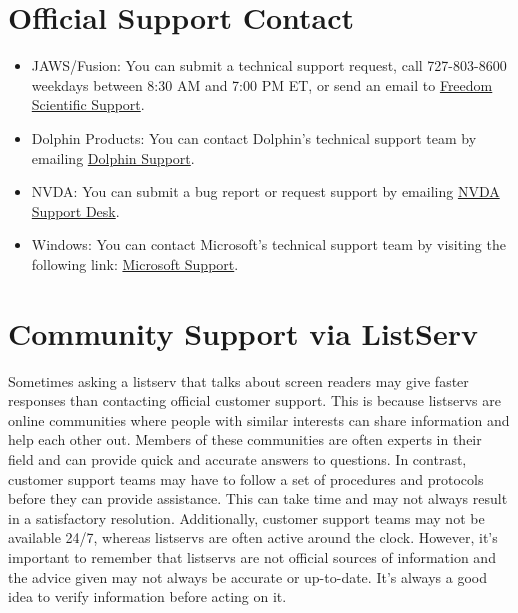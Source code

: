 \documentclass[12pt,letterpaper,twoside]{extreport}
\begin{document}
\begin{appendices}
\hypertarget{report}{}\section{Official Support Contact}\label{report}
\begin{itemize}[leftmargin=*]
\item JAWS/Fusion: You can submit a technical support request, call 727-803-8600 weekdays between 8:30 AM and 7:00 PM ET, or send an email to \href{http://support@freedomscientific.com}{Freedom Scientific Support}.
\item Dolphin Products: You can contact Dolphin’s technical support team by emailing \href{support@yourdolphin.com}{Dolphin Support}.
\item NVDA: You can submit a bug report or request support by emailing \href{http://info@nvaccess.org}{NVDA Support Desk}.
\item Windows: You can contact Microsoft’s technical support team by visiting the following link: \href{http://support.microsoft.com/en-us/contactus/}{Microsoft Support}.
\end{itemize}
\hypertarget{listserv}{}\section{Community Support via ListServ}\label{listserv}
Sometimes asking a listserv that talks about screen readers may give faster responses than contacting official customer support. This is because listservs are online communities where people with similar interests can share information and help each other out. Members of these communities are often experts in their field and can provide quick and accurate answers to questions. In contrast, customer support teams may have to follow a set of procedures and protocols before they can provide assistance. This can take time and may not always result in a satisfactory resolution. Additionally, customer support teams may not be available 24/7, whereas listservs are often active around the clock. However, it’s important to remember that listservs are not official sources of information and the advice given may not always be accurate or up-to-date. It’s always a good idea to verify information before acting on it.


\end{appendices}
\end{document}
